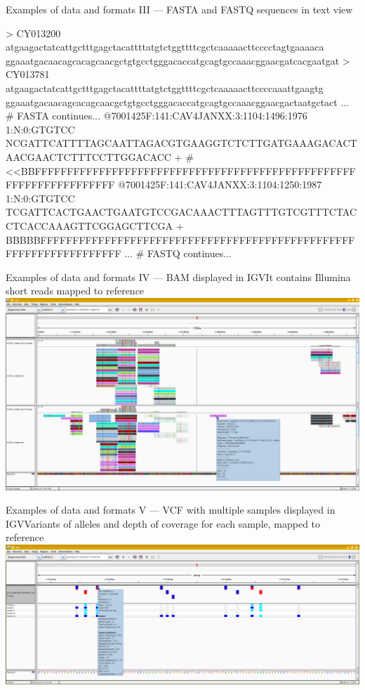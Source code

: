 \documentclass[compress, ucs, xelatex, 11pt, xcolor=svgnames,
  hyperref={
    bookmarks=true,
    unicode=true,
    colorlinks=true,
    pdftitle={Molecular data in R},
    plainpages=false,
    pdfauthor={Vojtech Zeisek},
    pdfsubject={Course about phylogeny and evolution in R},
    pdfcreator={XeLaTeX},
    pdfkeywords={R, evolution, phylogeny, molecular data},
    linkcolor=Tomato,
    anchorcolor=SaddleBrown,
    citecolor=Goldenrod,
    filecolor=DarkMagenta,
    menucolor=Sienna,
    urlcolor=DarkTurquoise,
    pdftex},
  url={hyphens, lowtilde} %
  ]{beamer}
\begin{document}
\begin{frame}[fragile]{Examples of data and formats III --- FASTA and FASTQ sequences in text view}
  \begin{spluscode}
    > CY013200
    atgaagactatcattgctttgagctacattttatgtctggttttcgctcaaaaacttcccctagtgaaaaca
    ggaaatgacaacagcacagcaacgctgtgcctgggacaccatgcagtgccaaacggaacgatcacgaatgat
    > CY013781
    atgaagactatcattgctttgagctacattttatgtctggttttcgctcaaaaacttccccaaattgaagtg
    ggaaatgacaacagcacagcaacgctgtgcctgggacaccatgcagtgccaaacggaacgactaatgctact
    ... # FASTA continues...
    @7001425F:141:CAV4JANXX:3:1104:1496:1976 1:N:0:GTGTCC
    NCGATTCATTTTAGCAATTAGACGTGAAGGTCTCTTGATGAAAGACACTAACGAACTCTTTCCTTGGACACC
    +
    #<<BBFFFFFFFFFFFFFFFFFFFFFFFFFFFFFFFFFFFFFFFFFFFFFFFFFFFFFFFFFFFFFFFFFFF
    @7001425F:141:CAV4JANXX:3:1104:1250:1987 1:N:0:GTGTCC
    TCGATTCACTGAACTGAATGTCCGACAAACTTTAGTTTGTCGTTTCTACCTCACCAAAGTTCGGAGCTTCGA
    +
    BBBBBFFFFFFFFFFFFFFFFFFFFFFFFFFFFFFFFFFFFFFFFFFFFFFFFFFFFFFFFFFFFFFFFFFF
    ... # FASTQ continues...
  \end{spluscode}
\end{frame}

\begin{frame}{Examples of data and formats IV --- BAM displayed in IGV}{It contains Illumina short reads mapped to reference}
  \includegraphics[width=\textwidth]{bam_igv.png}
\end{frame}

\begin{frame}{Examples of data and formats V --- VCF with multiple samples displayed in IGV}{Variants of alleles and depth of coverage for each sample, mapped to reference}
  \includegraphics[width=\textwidth]{vcf_igv.png}
\end{frame}
\end{document}
